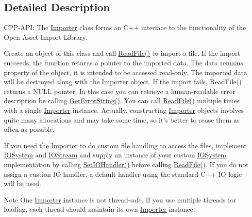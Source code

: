 \subsection{\-Detailed \-Description}
\-C\-P\-P-\/\-A\-P\-I\-: \-The \hyperlink{classAssimp_1_1Importer}{\-Importer} class forms an \-C++ interface to the functionality of the \-Open \-Asset \-Import \-Library.

\-Create an object of this class and call \hyperlink{classAssimp_1_1Importer_a174418ab41d5b8bc51a044895cb991e5}{\-Read\-File()} to import a file. \-If the import succeeds, the function returns a pointer to the imported data. \-The data remains property of the object, it is intended to be accessed read-\/only. \-The imported data will be destroyed along with the \hyperlink{classAssimp_1_1Importer}{\-Importer} object. \-If the import fails, \hyperlink{classAssimp_1_1Importer_a174418ab41d5b8bc51a044895cb991e5}{\-Read\-File()} returns a \-N\-U\-L\-L pointer. \-In this case you can retrieve a human-\/readable error description be calling \hyperlink{classAssimp_1_1Importer_a23bab5ba8cb9b6886c690a610766668b}{\-Get\-Error\-String()}. \-You can call \hyperlink{classAssimp_1_1Importer_a174418ab41d5b8bc51a044895cb991e5}{\-Read\-File()} multiple times with a single \hyperlink{classAssimp_1_1Importer}{\-Importer} instance. \-Actually, constructing \hyperlink{classAssimp_1_1Importer}{\-Importer} objects involves quite many allocations and may take some time, so it's better to reuse them as often as possible.

\-If you need the \hyperlink{classAssimp_1_1Importer}{\-Importer} to do custom file handling to access the files, implement \hyperlink{classAssimp_1_1IOSystem}{\-I\-O\-System} and \hyperlink{classAssimp_1_1IOStream}{\-I\-O\-Stream} and supply an instance of your custom \hyperlink{classAssimp_1_1IOSystem}{\-I\-O\-System} implementation by calling \hyperlink{classAssimp_1_1Importer_a1161f46318af18bb86dfe0fc3edea4df}{\-Set\-I\-O\-Handler()} before calling \hyperlink{classAssimp_1_1Importer_a174418ab41d5b8bc51a044895cb991e5}{\-Read\-File()}. \-If you do not assign a custion \-I\-O handler, a default handler using the standard \-C++ \-I\-O logic will be used.

\begin{DoxyNote}{\-Note}
\-One \hyperlink{classAssimp_1_1Importer}{\-Importer} instance is not thread-\/safe. \-If you use multiple threads for loading, each thread should maintain its own \hyperlink{classAssimp_1_1Importer}{\-Importer} instance. 
\end{DoxyNote}



